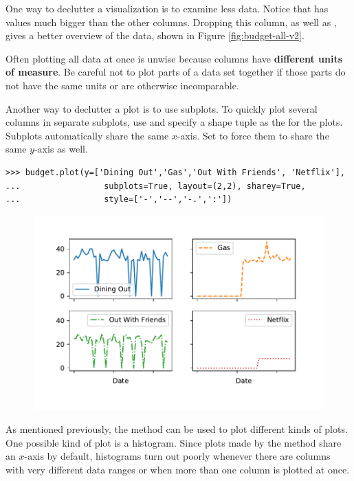 One way to declutter a visualization is to examine less data.
Notice that  has values much bigger than the other columns.
Dropping this column, as well as , gives a better overview of the data, shown in Figure \ref{fig:budget-all-v2}.

\begin{warn}
Often plotting all data at once is unwise because columns have \textbf{different units of measure}.
Be careful not to plot parts of a data set together if those parts do not have the same units or are otherwise incomparable.
\end{warn}

Another way to declutter a plot is to use subplots.
To quickly plot several columns in separate subplots, use  and specify a shape tuple as the  for the plots.
Subplots automatically share the same $x$-axis.
Set  to force them to share the same $y$-axis as well.

\begin{lstlisting}
>>> budget.plot(y=['Dining Out','Gas','Out With Friends', 'Netflix'],
...                 subplots=True, layout=(2,2), sharey=True,
...                 style=['-','--','-.',':'])
\end{lstlisting}

\begin{figure}[H]
    \includegraphics[width=.8\textwidth]{figures/line_subplots.pdf}
\end{figure}

As mentioned previously, the  method can be used to plot different kinds of plots.
One possible kind of plot is a histogram.
Since plots made by the  method share an $x$-axis by default, histograms turn out poorly whenever there are columns with very different data ranges or when more than one column is plotted at once.

